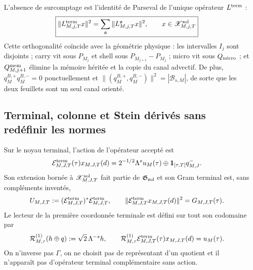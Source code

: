 L'absence de surcomptage est l'identité de Parseval de l'unique opérateur
$L^{\rm term}$ :
\begin{equation}\label{eq:pdf2-ns-six-loss-no-overcount}
 \boxed{\begin{gathered}
 \|L_{M,j,T}^{\rm term}x\|^2
 =\sum_{\mathfrak a}\|L_{M,j,T}^{\mathfrak a}x\|^2,
 \qquad x\in\mathscr X_{M,j,T}^{\rm sol}
 \end{gathered}}
\end{equation}
Cette orthogonalité coïncide avec la géométrie physique : les intervalles $I_j$
sont disjoints ; carry vit sous $P_{M_j}$ et shell sous
$P_{M_{j+1}}-P_{M_j}$ ; micro vit sous $Q_{\rm micro}$ ; et
$Q^{\rm mem}_{M,j+1}$ élimine la mémoire héritée et la copie du canal
advectif. De plus, $q_M^{B,+}q_M^{B,-}=0$ ponctuellement et
$\|(q_M^{B,+},q_M^{B,-})\|^2=|\mathscr B_{s,M}|$, de sorte que les deux feuillets
sont un seul canal orienté.

\subsection{Terminal, colonne et Stein dérivés sans redéfinir les normes}

Sur le noyau terminal, l'action de l'opérateur accepté est
\begin{equation}\label{eq:pdf2-ns-terminal-action-on-core}
 \mathcal E_{M,J,T}^{\rm term}(\tau)x_{M,J,T}(d)
 =2^{-1/2}\Lambda^su_M(\tau)
 \oplus\mathbf1_{[\tau,T]}q^-_{M,J}.
\end{equation}
Son extension bornée à $\mathscr X_{M,J,T}^{\rm sol}$ fait partie de
$\mathfrak G_{\rm sol}$ et son Gram terminal est, sans compléments inventés,
\begin{equation}\label{eq:pdf2-ns-terminal-metric}
 U_{M,J,T}:=
 (\mathcal E_{M,J,T}^{\rm term})^*\mathcal E_{M,J,T}^{\rm term},
 \qquad
 \|\mathcal E_{M,J,T}^{\rm term}x_{M,J,T}(d)\|^2
 =G_{M,J,T}(\tau).
\end{equation}
Le lecteur de la première coordonnée terminale est défini sur tout son
codomaine par
\begin{equation}\label{eq:pdf2-ns-terminal-reader}
 \mathcal R_{M,\tau}^{(1)}(h\oplus q):=
 \sqrt2\,\Lambda^{-s}h,
 \qquad
 \mathcal R_{M,\tau}^{(1)}
 \mathcal E_{M,J,T}^{\rm term}(\tau)x_{M,J,T}(d)=u_M(\tau).
\end{equation}
On n'inverse pas $\Gamma$, on ne choisit pas de représentant d'un quotient et il n'apparaît pas
d'opérateur terminal complémentaire sans action.

